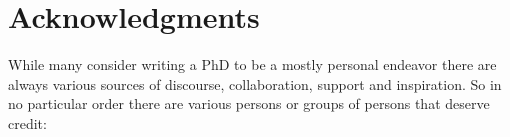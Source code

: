 \chapter*{Acknowledgments}
While many consider writing a PhD to be a mostly personal endeavor there are always various sources of discourse, collaboration, support and inspiration. 
So in no particular order there are various persons or groups of persons that deserve credit: 